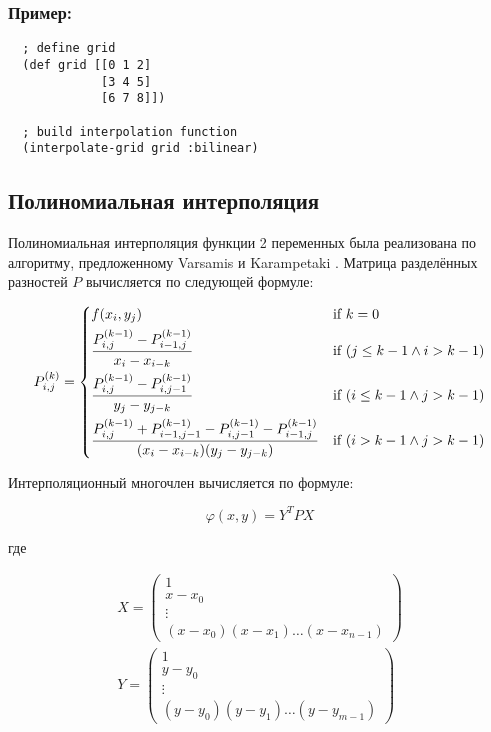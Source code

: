 \subsubsection{Пример:}

\begin{verbatim}
  ; define grid
  (def grid [[0 1 2]
             [3 4 5]
             [6 7 8]])

  ; build interpolation function
  (interpolate-grid grid :bilinear)
\end{verbatim}



\subsection{Полиномиальная интерполяция}

Полиномиальная интерполяция функции 2 переменных была реализована по алгоритму, предложенному Varsamis и Karampetaki \cite{varsamis2011}. Матрица разделённых разностей $P$ вычисляется по следующей формуле:

\begin{equation}
  P^{(k)}_{i,j} =
  \begin{dcases}
    f(x_i, y_j) & \text{if  } k = 0 \\
    \frac{P^{(k-1)}_{i,j} - P^{(k-1)}_{i-1,j}}{x_i - x_{i-k}} & \text{if  } (j \leq k - 1 \land i > k - 1) \\
    \frac{P^{(k-1)}_{i,j} - P^{(k-1)}_{i,j-1}}{y_j - y_{j-k}} & \text{if  } (i \leq k - 1 \land j > k - 1) \\
    \frac{P^{(k-1)}_{i,j} + P^{(k-1)}_{i-1,j-1} - P^{(k-1)}_{i,j-1} - P^{(k-1)}_{i-1,j}}{(x_i - x_{i-k})(y_j - y_{j-k})} & \text{if  } (i > k-1 \land j > k-1)
  \end{dcases}
\end{equation}

Интерполяционный многочлен вычисляется по формуле:

\begin{equation}
  \varphi(x, y) = Y^T P X
\end{equation}

\noindent где

\begin{equation}
  \begin{gathered}
    X =
    \begin{pmatrix}
      1 \\ x - x_0 \\ \vdots \\ (x - x_0)(x - x_1) \hdots (x - x_{n-1})
    \end{pmatrix}
    \\
    Y =
    \begin{pmatrix}
      1 \\ y - y_0 \\ \vdots \\ (y - y_0)(y - y_1) \hdots (y - y_{m-1})
    \end{pmatrix}
  \end{gathered}
\end{equation}

